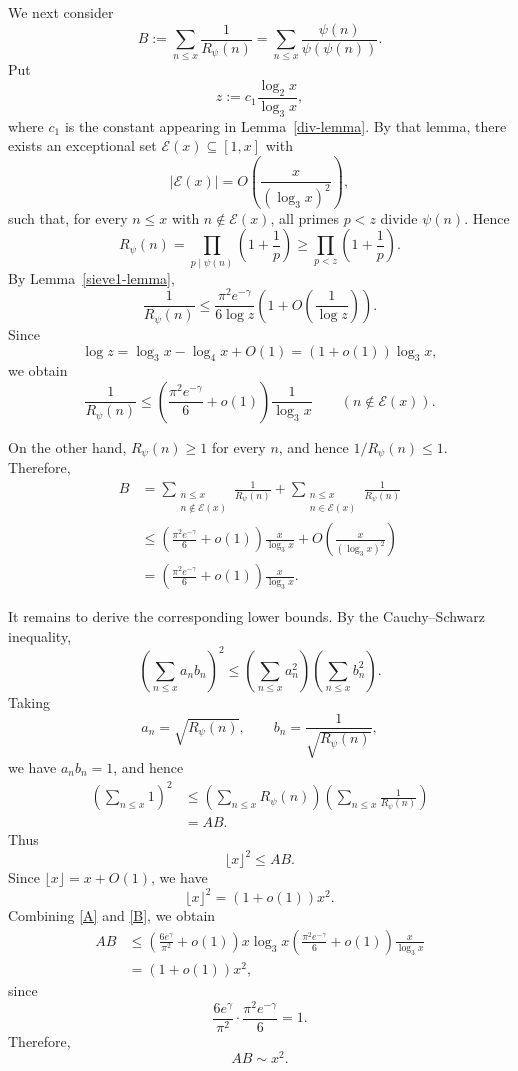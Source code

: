 \documentclass{article}
\theoremstyle{remark}
\begin{document}
We next consider
\[
B
:=
\sum_{n\le x}\frac{1}{R_\psi(n)}
=
\sum_{n\le x}\frac{\psi(n)}{\psi(\psi(n))}.
\]
Put
\[
z:=c_1\frac{\log_2 x}{\log_3 x},
\]
where \(c_1\) is the constant appearing in Lemma~\ref{div-lemma}. By that lemma, there exists an exceptional set \(\mathcal E(x)\subseteq[1,x]\) with
\[
|\mathcal E(x)|
=
O\left(\frac{x}{(\log_3 x)^2}\right),
\]
such that, for every \(n\le x\) with \(n\notin\mathcal E(x)\),
all primes \(p<z\) divide \(\psi(n)\). Hence
\[
R_\psi(n)
=
\prod_{p\mid\psi(n)}
\left(1+\frac1p\right)
\ge
\prod_{p<z}\left(1+\frac1p\right).
\]
By Lemma~\ref{sieve1-lemma},
\[
\frac1{R_\psi(n)}
\le
\frac{\pi^2e^{-\gamma}}{6\log z}
\left(1+O\left(\frac1{\log z}\right)\right).
\]
Since
\[
\log z
=
\log_3x-\log_4x+O(1)
=
(1+o(1))\log_3x,
\]
we obtain
\[
\frac1{R_\psi(n)}
\le
\left(\frac{\pi^2e^{-\gamma}}6+o(1)\right)
\frac1{\log_3x}
\qquad
(n\notin\mathcal E(x)).
\]

On the other hand, \(R_\psi(n)\ge1\) for every \(n\), and hence
\(1/R_\psi(n)\le1\). Therefore,
\begin{equation}
\begin{aligned}\label{B}
B
&=
\sum_{\substack{n\le x\\n\notin\mathcal E(x)}}
\frac1{R_\psi(n)}
+
\sum_{\substack{n\le x\\n\in\mathcal E(x)}}
\frac1{R_\psi(n)}\\
&\le
\left(\frac{\pi^2e^{-\gamma}}6+o(1)\right)
\frac{x}{\log_3x}
+
O\left(\frac{x}{(\log_3x)^2}\right)\\
&=
\left(\frac{\pi^2e^{-\gamma}}6+o(1)\right)
\frac{x}{\log_3x}.
\end{aligned}
\end{equation}

It remains to derive the corresponding lower bounds. By the
Cauchy--Schwarz inequality,
\[
\left(\sum_{n\le x}a_nb_n\right)^2
\le
\left(\sum_{n\le x}a_n^2\right)
\left(\sum_{n\le x}b_n^2\right).
\]
Taking
\[
a_n=\sqrt{R_\psi(n)},
\qquad
b_n=\frac{1}{\sqrt{R_\psi(n)}},
\]
we have \(a_nb_n=1\), and hence
\[
\begin{aligned}
\left(\sum_{n\le x}1\right)^2
&\le
\left(\sum_{n\le x}R_\psi(n)\right)
\left(\sum_{n\le x}\frac{1}{R_\psi(n)}\right)\\
&=AB.
\end{aligned}
\]
Thus
\[
\lfloor x\rfloor^2\le AB.
\]
Since \(\lfloor x\rfloor=x+O(1)\), we have
\[
\lfloor x\rfloor^2=(1+o(1))x^2.
\]
Combining \eqref{A} and \eqref{B}, we obtain
\[
\begin{aligned}
AB
&\le
\left(\frac{6e^\gamma}{\pi^2}+o(1)\right)
x\log_3x
\left(\frac{\pi^2e^{-\gamma}}6+o(1)\right)
\frac{x}{\log_3x}\\
&=(1+o(1))x^2,
\end{aligned}
\]
since
\[
\frac{6e^\gamma}{\pi^2}
\cdot
\frac{\pi^2e^{-\gamma}}6
=1.
\]
Therefore,
\[
AB\sim x^2.
\]
\end{document}
